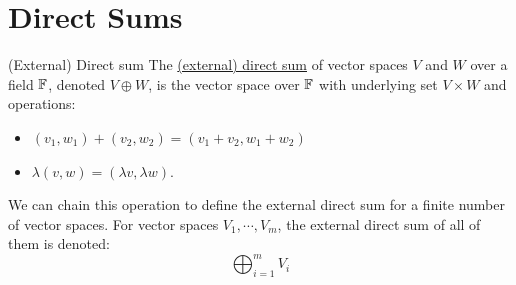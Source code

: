 \documentclass[../Main.tex]{subfiles}
\begin{document}
\section{Direct Sums}
\begin{definition}{(External) Direct sum}
    The \underline{(external) direct sum} of vector spaces $V$ and $W$ over a field $\mathbb{F}$, denoted $V \oplus W$, is the vector space over $\mathbb{F}$ with underlying set $V \times W$ and operations:
    \begin{itemize}
        \item $(v_1, w_1) + (v_2, w_2) = (v_1 + v_2, w_1 + w_2)$
        \item $\lambda(v, w) = (\lambda v, \lambda w)$.
    \end{itemize}
\end{definition}
We can chain this operation to define the external direct sum for a finite number of vector spaces. For vector spaces $V_1, \cdots, V_m$, the external direct sum of all of them is denoted:
\begin{equation*}
    \bigoplus_{i = 1}^m V_i
\end{equation*}
\end{document}
